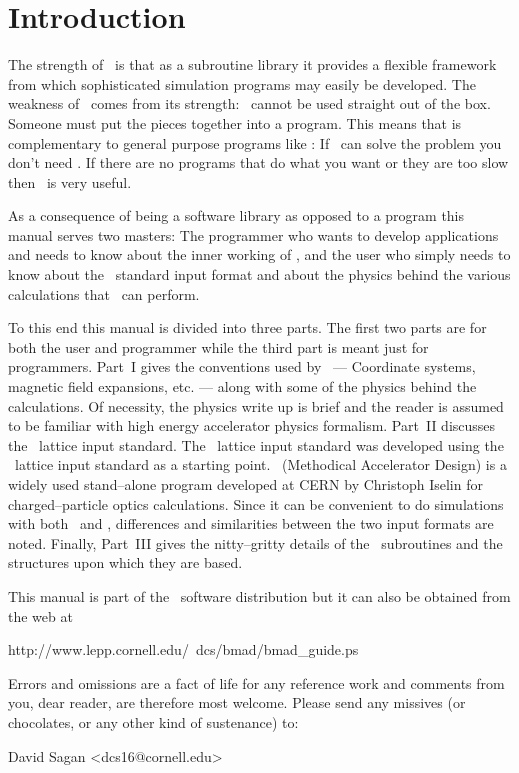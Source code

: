 \section*{Introduction}

The strength of \bmad\ is that as a subroutine library it provides a
flexible framework from which sophisticated simulation programs may
easily be developed.  The weakness of \bmad\ comes from its strength:
\bmad\ cannot be used straight out of the box. Someone must put the
pieces together into a program. This means that \bmad is complementary
to general purpose programs like \mad: If \mad\ can solve the problem
you don't need \bmad. If there are no programs that do what you want 
or they are too slow then \bmad\ is very useful.

As a consequence of \bmad being a software library as opposed to a
program this manual serves two masters: The programmer who wants to
develop applications and needs to know about the inner working of \bmad,
and the user who simply needs to know about the \bmad\ standard input
format and about the physics behind the various calculations that \bmad\
can perform.

To this end this manual is divided into three parts. The first two
parts are for both the user and programmer while the third part is
meant just for programmers. Part~I gives the conventions used by
\bmad\ --- Coordinate systems, magnetic field expansions, etc. ---
along with some of the physics behind the calculations. Of necessity,
the physics write up is brief and the reader is assumed to be familiar
with high energy accelerator physics formalism. Part~II discusses the
\bmad\ lattice input standard.  The \bmad\ lattice input standard was
developed using the \mad\ lattice input standard as a starting
point. \mad\ (Methodical Accelerator Design) is a widely used
stand--alone program developed at CERN by Christoph Iselin for
charged--particle optics calculations. Since it can be convenient
to do simulations with both \mad\ and \bmad, differences and
similarities between the two input formats are noted. 
Finally, Part~III gives the nitty--gritty details of the \bmad\
subroutines and the structures upon which they are based.

This manual is part of the 
\bmad\ software distribution but it can also be obtained from the web at
\begin{example}
  http://www.lepp.cornell.edu/~dcs/bmad/bmad_guide.ps
\end{example}

Errors and omissions are a fact of life for any reference work and
comments from you, dear reader, are therefore most welcome. Please
send any missives (or chocolates, or any other kind of sustenance) to:
\begin{example}
  David Sagan <dcs16@cornell.edu>
\end{example}
